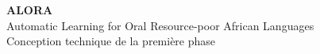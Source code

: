\documentclass[11pt,a4paper]{article}
\begin{document}
\begin{center}
{\LARGE\textbf{ALORA}}\\[0.25cm]
{\large Automatic Learning for Oral Resource-poor African Languages}\\[0.5cm]
{\Large Conception technique de la première phase}
\end{center}

\vspace{0.4cm}










\end{document}
